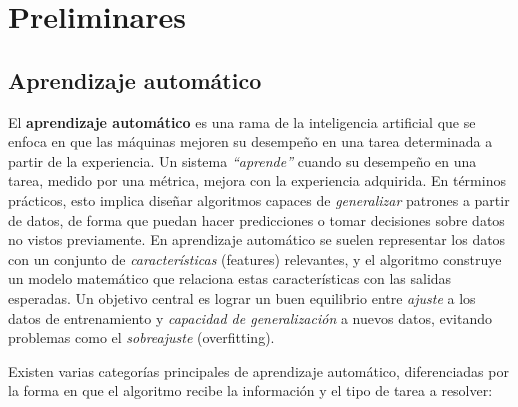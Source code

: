 \documentclass[11pt,spanish,listoffigures,listoftables]{tfgetsinf}
\begin{document}

\chapter{Preliminares}  %
\section{Aprendizaje automático}
El \textbf{aprendizaje automático} es una rama de la inteligencia artificial que se enfoca en que las máquinas mejoren 
su desempeño en una tarea determinada a partir de la experiencia. Un sistema \textit{“aprende”} cuando su desempeño en una tarea, 
medido por una métrica, mejora con la experiencia adquirida. En términos prácticos, esto implica diseñar algoritmos capaces de 
\textit{generalizar} patrones a partir de datos, de forma que puedan hacer predicciones o tomar decisiones sobre datos no vistos 
previamente. En aprendizaje automático se suelen representar los datos con un conjunto de \textit{características} (features) relevantes, y el algoritmo 
construye un modelo matemático que relaciona estas características con las salidas esperadas. Un objetivo central es lograr un buen 
equilibrio entre \textit{ajuste} a los datos de entrenamiento y \textit{capacidad de generalización} a nuevos datos, evitando problemas 
como el \textit{sobreajuste} (overfitting).

Existen varias categorías principales de aprendizaje automático, diferenciadas por la forma en que el algoritmo recibe la información 
y el tipo de tarea a resolver:
\end{document}
